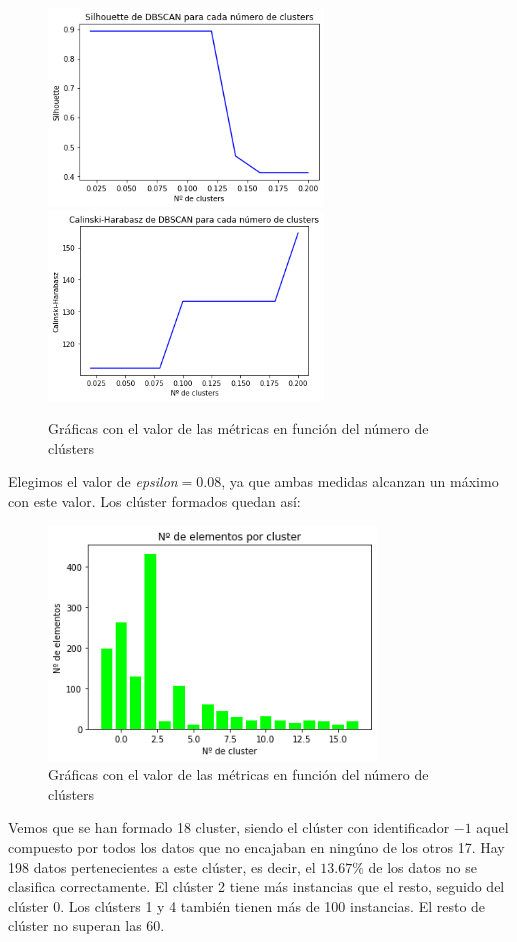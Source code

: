 \documentclass[a4]{article}
\begin{document}
\begin{figure}[H]
  \centering
  \caption{Gráficas con el valor de las métricas en función del número de clústers}
  \includegraphics[width=73mm]{imagenes/c1_dbscan_sil}
  \includegraphics[width=73mm]{imagenes/c1_dbscan_cal}
\end{figure}

Elegimos el valor de \textit{epsilon}$ = 0.08$, ya que ambas medidas alcanzan un máximo con este valor. Los clúster formados quedan así:

\begin{figure}[H]
  \centering
  \caption{Gráficas con el valor de las métricas en función del número de clústers}
  \includegraphics[width=87mm]{imagenes/c1_dbscan_cluster}
\end{figure}

Vemos que se han formado 18 cluster, siendo el clúster con identificador $-1$ aquel compuesto por todos los datos que no encajaban en ningúno de los otros 17. Hay 198 datos pertenecientes a este clúster, es decir, el $13.67\%$ de los datos no se clasifica correctamente. El clúster 2 tiene más instancias que el resto, seguido del clúster 0. Los clústers 1 y 4 también tienen más de 100 instancias. El resto de clúster no superan las 60.
\end{document}
